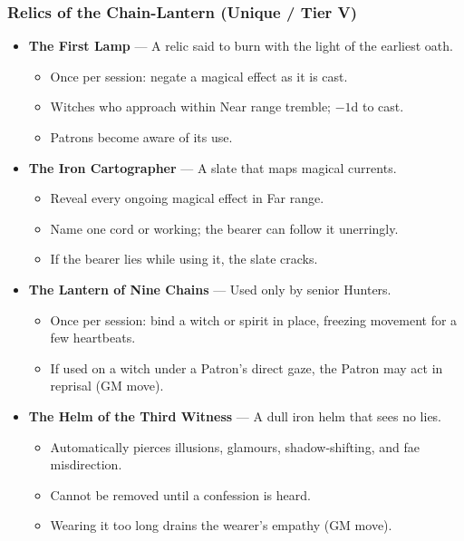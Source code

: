 \documentclass[11pt]{book}
\begin{document}
\subsubsection*{Relics of the Chain-Lantern (Unique / Tier V)}

\begin{itemize}[leftmargin=*]
    \item \textbf{The First Lamp} ---  
        A relic said to burn with the light of the earliest oath.  
        \begin{itemize}
            \item Once per session: negate a magical effect as it is cast.  
            \item Witches who approach within Near range tremble; \(-1\)d to cast.  
            \item Patrons become aware of its use.
        \end{itemize}

    \item \textbf{The Iron Cartographer} --- A slate that maps magical currents.  
        \begin{itemize}
            \item Reveal every ongoing magical effect in Far range.  
            \item Name one cord or working; the bearer can follow it unerringly.  
            \item If the bearer lies while using it, the slate cracks.
        \end{itemize}

    \item \textbf{The Lantern of Nine Chains} ---  
        Used only by senior Hunters.  
        \begin{itemize}
            \item Once per session: bind a witch or spirit in place, freezing 
                  movement for a few heartbeats.  
            \item If used on a witch under a Patron's direct gaze, the Patron may 
                  act in reprisal (GM move).
        \end{itemize}

    \item \textbf{The Helm of the Third Witness} ---  
        A dull iron helm that sees no lies.  
        \begin{itemize}
            \item Automatically pierces illusions, glamours, shadow-shifting, 
                  and fae misdirection.  
            \item Cannot be removed until a confession is heard.  
            \item Wearing it too long drains the wearer's empathy (GM move).
        \end{itemize}
\end{itemize}
\end{document}
